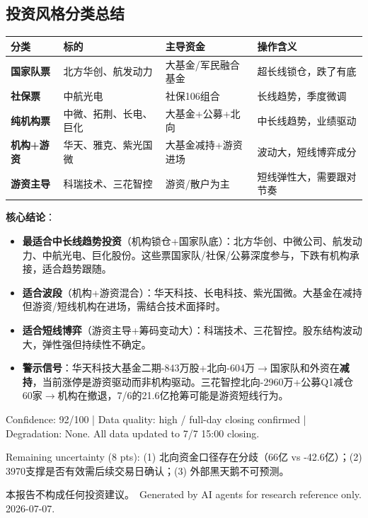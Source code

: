 \documentclass[a4paper,11pt,fontset=none]{ctexart}
\newcommand{\reportdisclaimer}{本报告不构成任何投资建议。}
\begin{document}
\subsection*{投资风格分类总结}

\begin{tabularx}{\textwidth}{L{2.5cm}L{3cm}L{3cm}X}
\toprule
\textbf{分类} & \textbf{标的} & \textbf{主导资金} & \textbf{操作含义} \\
\midrule
\textbf{国家队票} & 北方华创、航发动力 & 大基金/军民融合基金 & 超长线锁仓，跌了有底 \\
\textbf{社保票} & 中航光电 & 社保106组合 & 长线趋势，季度微调 \\
\textbf{纯机构票} & 中微、拓荆、长电、巨化 & 大基金+公募+北向 & 中长线趋势，业绩驱动 \\
\textbf{机构+游资} & 华天、雅克、紫光国微 & 大基金减持+游资进场 & 波动大，短线博弈成分 \\
\textbf{游资主导} & 科瑞技术、三花智控 & 游资/散户为主 & 短线弹性大，需要跟对节奏 \\
\bottomrule
\end{tabularx}

\textbf{核心结论}：
\begin{itemize}
  \item \textbf{最适合中长线趋势投资}（机构锁仓+国家队底）：北方华创、中微公司、航发动力、中航光电、巨化股份。这些票国家队/社保/公募深度参与，下跌有机构承接，适合趋势跟随。
  \item \textbf{适合波段}（机构+游资混合）：华天科技、长电科技、紫光国微。大基金在减持但游资/短线机构在进场，需结合技术面择时。
  \item \textbf{适合短线博弈}（游资主导+筹码变动大）：科瑞技术、三花智控。股东结构波动大，弹性强但持续性不确定。
  \item \textbf{警示信号}：华天科技大基金二期-843万股+北向-604万$\to$国家队和外资在\textbf{减持}，当前涨停是游资驱动而非机构驱动。三花智控北向-2960万+公募Q1减仓60家$\to$机构在撤退，7/6的21.6亿抢筹可能是游资短线行为。
\end{itemize}

\vfill
\begin{disclosurebox}[Metadata]
\footnotesize
Confidence: 92/100 \quad | \quad
Data quality: high / full-day closing confirmed \quad | \quad
Degradation: None. All data updated to 7/7 15:00 closing.

\vspace{0.3em}
Remaining uncertainty (8 pts): (1) 北向资金口径存在分歧（66亿 vs -42.6亿）；(2) 3970支撑是否有效需后续交易日确认；(3) 外部黑天鹅不可预测。

\vspace{0.4em}
{\tiny\reportdisclaimer\ Generated by AI agents for research reference only. 2026-07-07.}
\end{disclosurebox}
\end{document}
